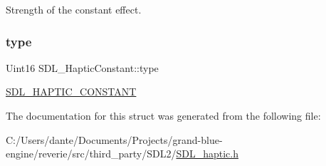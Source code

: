 Strength of the constant effect. \mbox{\label{struct_s_d_l___haptic_constant_a5cb31202803a8bc1be95fcede5ac8afb}} 
\subsubsection{\texorpdfstring{type}{type}}
{\footnotesize\ttfamily Uint16 S\+D\+L\+\_\+\+Haptic\+Constant\+::type}

\mbox{\hyperlink{_s_d_l__haptic_8h_a955fb9f680dcf9cc72a3d5263e85b80a}{S\+D\+L\+\_\+\+H\+A\+P\+T\+I\+C\+\_\+\+C\+O\+N\+S\+T\+A\+NT}} 

The documentation for this struct was generated from the following file\+:\begin{DoxyCompactItemize}
\item 
C\+:/\+Users/dante/\+Documents/\+Projects/grand-\/blue-\/engine/reverie/src/third\+\_\+party/\+S\+D\+L2/\mbox{\hyperlink{_s_d_l__haptic_8h}{S\+D\+L\+\_\+haptic.\+h}}\end{DoxyCompactItemize}
